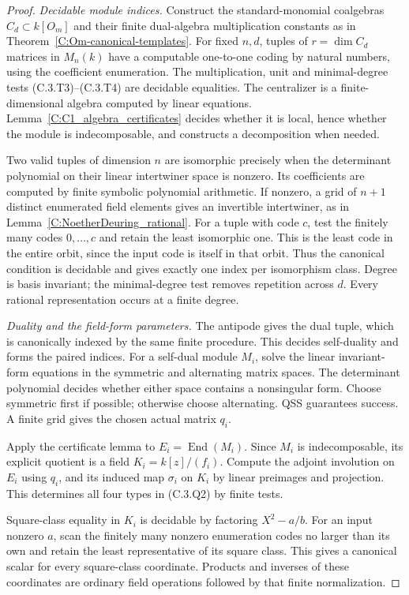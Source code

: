 \begin{proof}
\emph{Decidable module indices.}
Construct the standard-monomial coalgebras $C_d\subset k[O_m]$ and their
finite dual-algebra multiplication constants as in
Theorem~\ref{C:Om-canonical-templates}. For fixed $n,d$, tuples of
$r=\dim C_d$ matrices in $M_n(k)$ have a computable one-to-one coding
by natural numbers, using the coefficient enumeration. The multiplication,
unit and minimal-degree tests (C.3.T3)--(C.3.T4) are decidable equalities.
The centralizer is a finite-dimensional algebra computed by linear
equations. Lemma~\ref{C:C1_algebra_certificates} decides whether it is
local, hence whether the module is indecomposable, and constructs a
decomposition when needed.

Two valid tuples of dimension $n$ are isomorphic precisely when the
determinant polynomial on their linear intertwiner space is nonzero.
Its coefficients are computed by finite symbolic polynomial arithmetic.
If nonzero, a grid of $n+1$ distinct enumerated field elements gives an
invertible intertwiner, as in Lemma~\ref{C:NoetherDeuring_rational}.
For a tuple with code $c$, test the finitely many codes $0,\ldots,c$
and retain the least isomorphic one. This is the least code in the
entire orbit, since the input code is itself in that orbit. Thus the
canonical condition is decidable and gives exactly one index per
isomorphism class. Degree is basis invariant; the minimal-degree test
removes repetition across $d$. Every rational representation occurs
at a finite degree.

\emph{Duality and the field-form parameters.}
The antipode gives the dual tuple, which is canonically indexed by the
same finite procedure. This decides self-duality and forms the paired
indices. For a self-dual module $M_i$, solve the linear invariant-form
equations in the symmetric and alternating matrix spaces. The determinant
polynomial decides whether either space contains a nonsingular form.
Choose symmetric first if possible; otherwise choose alternating. QSS
guarantees success. A finite grid gives the chosen actual matrix $q_i$.

Apply the certificate lemma to $E_i=\operatorname{End}(M_i)$. Since
$M_i$ is indecomposable, its explicit quotient is a field
$K_i=k[z]/(f_i)$. Compute the adjoint involution on $E_i$ using $q_i$,
and its induced map $\sigma_i$ on $K_i$ by linear preimages and projection.
This determines all four types in (C.3.Q2) by finite tests.

Square-class equality in $K_i$ is decidable by factoring $X^2-a/b$.
For an input nonzero $a$, scan the finitely many nonzero enumeration
codes no larger than its own and retain the least representative of
its square class. This gives a canonical scalar for every square-class
coordinate. Products and inverses of these coordinates are ordinary
field operations followed by that finite normalization.


\end{proof}
